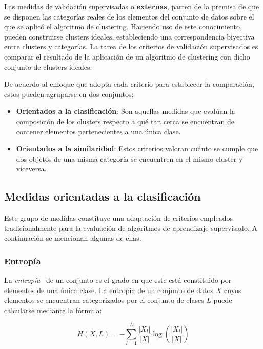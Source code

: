 Las medidas de validación supervisadas o \textbf{externas}, parten de la premisa de que se disponen las categorías reales de los elementos del conjunto de datos sobre el que se aplicó el algoritmo de clustering.
Haciendo uso de este conocimiento, pueden construirse clusters ideales, estableciendo una correspondencia biyectiva entre clusters y categorías.
La tarea de los criterios de validación supervisados es comparar el resultado de la aplicación de un algoritmo de clustering con dicho conjunto de clusters ideales.

De acuerdo al enfoque que adopta cada criterio para establecer la comparación, estos pueden agruparse en dos conjuntos:

\begin{itemize}
    \item \textbf{Orientados a la clasificación}: Son aquellas medidas que evalúan la composición de los clusters respecto a qué tan cerca se encuentran de contener elementos pertenecientes a una única clase.
    \item \textbf{Orientados a la similaridad}: Estos criterios valoran cuánto se cumple que dos objetos de una misma categoría se encuentren en el mismo cluster y viceversa.
\end{itemize}

\subsection{Medidas orientadas a la clasificación}\label{subsec:medidasOrientadasALaClasificación}

Este grupo de medidas constituye una adaptación de criterios empleados tradicionalmente para la evaluación de algoritmos de aprendizaje supervisado.
A continuación se mencionan algunas de ellas.

\subsubsection{Entropía}

La \textit{entropía}~\cite{Tan05,Wagner07} de un conjunto es el grado en que este está constituido por elementos de una única clase.
La entropía de un conjunto de datos $X$ cuyos elementos se encuentran categorizados por el conjunto de clases $L$ puede calcularse mediante la fórmula:

\begin{equation}
    \label{eq:entropy}
    H(X, L) = -\sum_{l=1}^{|L|}{\frac{|X_l|}{|X|}\log{\left( \frac{|X_l|}{|X|} \right)}}
\end{equation}

